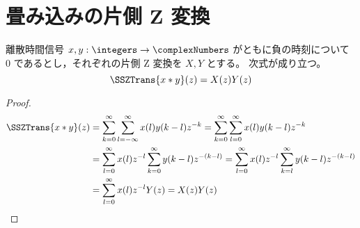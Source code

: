 		\section{畳み込みの片側 Z 変換}
			\label{single_sided_Z_transform_of_convolution}
			\begin{shadebox}
				離散時間信号 $x,y:\integers\to\complexNumbers$ がともに負の時刻について 0 であるとし，それぞれの片側 Z 変換を $X,Y$ とする。
				次式が成り立つ。
				\[ \SSZTrans{x*y}(z) = X(z)Y(z) \]
			\end{shadebox}
			\begin{proof}
				\begin{align*}
					\SSZTrans{x*y}(z) &= \sum_{k=0}^\infty \sum_{l=-\infty}^\infty x(l)y(k-l) z^{-k} = \sum_{k=0}^\infty \sum_{l=0}^\infty x(l)y(k-l) z^{-k} \\
					&= \sum_{l=0}^\infty x(l)z^{-l} \sum_{k=0}^\infty y(k-l) z^{-(k-l)} = \sum_{l=0}^\infty x(l)z^{-l} \sum_{k=l}^\infty y(k-l) z^{-(k-l)} \\
					&= \sum_{l=0}^\infty x(l)z^{-l} Y(z) = X(z)Y(z)
				\end{align*}
			\end{proof}
